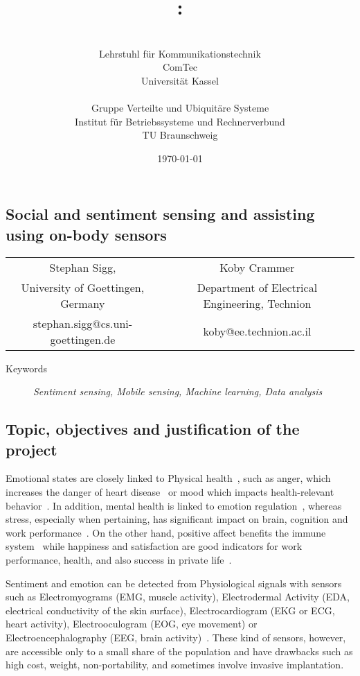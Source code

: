 \documentclass[12pt]{article}
\author{\begin{minipage}[t]{7.1cm}\centering \small \VornameAntragstellerA\ \NachnameAntragstellerA\\ \small Lehrstuhl für Kommunikationstechnik\\ \small ComTec\\ \small Universität Kassel\end{minipage}
\begin{minipage}[t]{7.1cm}\centering \small \VornameAntragstellerB\ \NachnameAntragstellerB\\ \small Gruppe Verteilte und Ubiquitäre Systeme \\ \small Institut für Betriebssysteme und Rechnerverbund\\ \small TU Braunschweig\end{minipage}}
\title{\projektname:\\\notiz{Social and sentiment sensing and assisting using on-body sensors}}
\date{\small \today}
\begin{document}
\onehalfspacing %
\setcounter{secnumdepth}{5}
\pagebreak
\begin{center}
\section*{Social and sentiment sensing and assisting using on-body sensors}
\begin{tabular}{cc}
  Stephan Sigg, & Koby Crammer\\
  University of Goettingen, Germany & Department of Electrical Engineering, Technion \\
 stephan.sigg@cs.uni-goettingen.de & koby@ee.technion.ac.il
\end{tabular}

\end{center}
\begin{description}
	\item[Keywords] \textit{Sentiment sensing, Mobile sensing, Machine learning, Data analysis}
\end{description}

\subsection*{Topic, objectives and justification of the project}
Emotional states are closely linked to Physical health~\cite{SentimentSensing_Salovey_2000}, such as anger, which increases the danger of heart disease~\cite{SentimentSensing_Smith_2004} or mood which impacts health-relevant behavior~\cite{SentimentSensing_Todaro_2003}.
In addition, mental health is linked to emotion regulation~\cite{SentimentSensing_Gross_1995}, whereas stress, especially when pertaining, has significant impact on brain, cognition and work performance~\cite{SentimentSensing_Lupien_2009}.
On the other hand, positive affect benefits the immune system~\cite{SentimentSensing_Smith_2004} while happiness and satisfaction are good indicators for work performance, health, and also success in private life~\cite{SentimentSensing_Lyubomirsky_2005}.

Sentiment and emotion can be detected from Physiological signals with sensors such as Electromyograms (EMG, muscle activity), Electrodermal Activity (EDA, electrical conductivity of the skin surface), Electrocardiogram (EKG or ECG, heart activity), Electrooculogram (EOG, eye movement) or Electroencephalography (EEG, brain activity)~\cite{SentimentSensing_Calvo_2010}.
These kind of sensors, however, are accessible only to a small share of the population and have drawbacks such as high cost, weight, non-portability, and sometimes involve invasive implantation.
\end{document}
